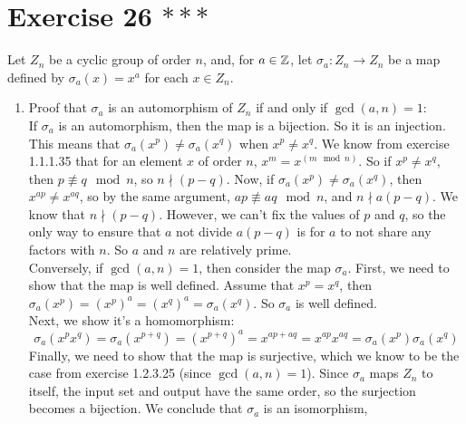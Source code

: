\documentclass[12pt]{article}
\begin{document}
    \section*{Exercise 26 $***$}
    Let $Z_n$ be a cyclic group of order $n$, and, for $a \in \mathbb{Z}$,
    let $\sigma_a: Z_n \to Z_n$ be a map
    defined by $\sigma_a(x) = x^a$ for each $x \in Z_n$. \\
    \begin{enumerate}[label=\textbf{\alph*.}]
        \item 
            Proof that $\sigma_a$ is an automorphism of $Z_n$
            if and only if $\gcd(a, n) = 1$: \\
            If $\sigma_a$ is an automorphism,
            then the map is a bijection.
            So it is an injection.
            This means that $\sigma_a(x^p) \neq \sigma_a(x^q)$
            when $x^p \neq x^q$.
            We know from exercise 1.1.1.35 that for an element $x$ of
            order $n$, $x^m = x^{(m \mod n)}$.
            So if $x^p \neq x^q$, then $p \not\equiv q \mod n$,
            so $n \nmid (p - q)$.
            Now, if $\sigma_a(x^p) \neq \sigma_a(x^q)$,
            then $x^{ap} \neq x^{aq}$,
            so by the same argument, $ap \not\equiv aq \mod n$,
            and $n \nmid a(p - q)$.
            We know that $n \nmid (p-q)$.
            However, we can't fix the values of $p$ and $q$,
            so the only way to ensure that $a$ not divide $a(p - q)$
            is for $a$ to not share any factors with $n$.
            So $a$ and $n$ are relatively prime. \\
            Conversely, if $\gcd(a, n) = 1$,
            then consider the map $\sigma_a$.
            First, we need to show that the map is well defined.
            Assume that $x^p = x^q$,
            then $\sigma_a(x^p) = (x^p)^a = (x^q)^a = \sigma_a(x^q)$.
            So $\sigma_a$ is well defined. \\
            Next, we show it's a homomorphism:
            \[ \sigma_a(x^px^q) = \sigma_a(x^{p + q})
            = (x^{p + q})^a
            = x^{ap + aq}
            = x^{ap}x^{aq}
            = \sigma_a(x^p)\sigma_a(x^q) \]
            Finally, we need to show that the map is surjective,
            which we know to be the case from
            exercise 1.2.3.25 (since $\gcd(a, n) = 1$).
            Since $\sigma_a$ maps $Z_n$ to itself,
            the input set and output have the same order,
            so the surjection becomes a bijection.
            We conclude that $\sigma_a$ is an isomorphism,

\end{enumerate}
\end{document}
